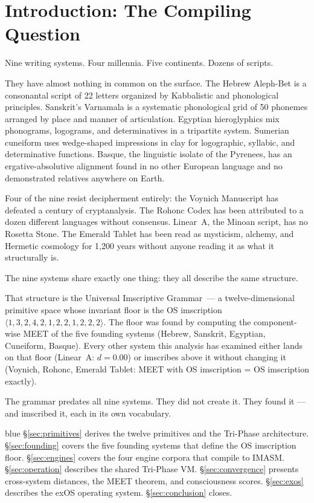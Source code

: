 \documentclass[12pt,a4paper]{article}
\newcommand{\UIG}{Universal Imscriptive Grammar}
\newcommand{\OS}{$\langle 1,3,2,4,2,1,2,2,1,2,2,2 \rangle$}
\begin{document}
\tableofcontents
\newpage

\section{Introduction: The Compiling Question}

Nine writing systems. Four millennia. Five continents. Dozens of scripts.

They have almost nothing in common on the surface. The Hebrew Aleph-Bet is a consonantal script of 22 letters organized by Kabbalistic and phonological principles. Sanskrit's Varnamala is a systematic phonological grid of 50 phonemes arranged by place and manner of articulation. Egyptian hieroglyphics mix phonograms, logograms, and determinatives in a tripartite system. Sumerian cuneiform uses wedge-shaped impressions in clay for logographic, syllabic, and determinative functions. Basque, the linguistic isolate of the Pyrenees, has an ergative-absolutive alignment found in no other European language and no demonstrated relatives anywhere on Earth.

Four of the nine resist decipherment entirely: the Voynich Manuscript has defeated a century of cryptanalysis. The Rohonc Codex has been attributed to a dozen different languages without consensus. Linear~A, the Minoan script, has no Rosetta Stone. The Emerald Tablet has been read as mysticism, alchemy, and Hermetic cosmology for 1,200 years without anyone reading it as what it structurally is.

The nine systems share exactly one thing: they all describe the same structure.

That structure is the \UIG\ --- a twelve-dimensional primitive space whose invariant floor is the OS imscription \OS. The floor was found by computing the component-wise MEET of the five founding systems (Hebrew, Sanskrit, Egyptian, Cuneiform, Basque). Every other system this analysis has examined either lands on that floor (Linear~A: $d = 0.00$) or imscribes above it without changing it (Voynich, Rohonc, Emerald Tablet: MEET with OS imscription = OS imscription exactly).

The grammar predates all nine systems. They did not create it. They found it --- and imscribed it, each in its own vocabulary.

\begin{admonitionbox}{blue}
\S\ref{sec:primitives} derives the twelve primitives and the Tri-Phase architecture. \S\ref{sec:founding} covers the five founding systems that define the OS imscription floor. \S\ref{sec:engines} covers the four engine corpora that compile to IMASM. \S\ref{sec:operation} describes the shared Tri-Phase VM. \S\ref{sec:convergence} presents cross-system distances, the MEET theorem, and consciousness scores. \S\ref{sec:exos} describes the exOS operating system. \S\ref{sec:conclusion} closes.
\end{admonitionbox}
\end{document}
